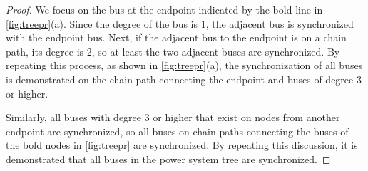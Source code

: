 \documentclass[graybox, envcountchap]{svmult}
\begin{document}
\begin{proof}
We focus on the bus at the endpoint indicated by the bold line in
\ref{fig:treepr}(a). Since the degree of the bus is 1, the adjacent bus is
synchronized with the endpoint bus. Next, if the adjacent bus to the endpoint is
on a chain path, its degree is 2, so at least the two adjacent buses are
synchronized. By repeating this process, as shown in \ref{fig:treepr}(a), the
synchronization of all buses is demonstrated on the chain path connecting the
endpoint and buses of degree 3 or higher.

Similarly, all buses with degree 3 or higher that exist on nodes from another
endpoint are synchronized, so all buses on chain paths connecting the buses of
the bold nodes in \ref{fig:treepr} are synchronized. By repeating this
discussion, it is demonstrated that all buses in the power system tree are
synchronized.
\end{proof}
\end{document}
